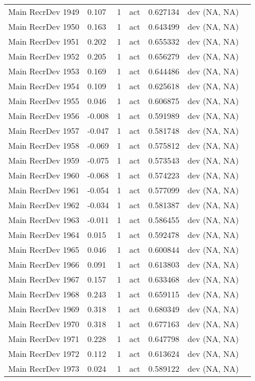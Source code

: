 \documentclass[11pt,
  english,
  a4paper,
]{article}
\begin{document}
\begin{landscape}
\begin{longtable}[t]{>{\raggedright\arraybackslash}p{6cm}lllll>{\raggedright\arraybackslash}p{4cm}}
Main RecrDev 1949 & 0.107 & 1 & act & 0.627134 & dev (NA, NA)\\
Main RecrDev 1950 & 0.163 & 1 & act & 0.643499 & dev (NA, NA)\\
Main RecrDev 1951 & 0.202 & 1 & act & 0.655332 & dev (NA, NA)\\
Main RecrDev 1952 & 0.205 & 1 & act & 0.656279 & dev (NA, NA)\\
Main RecrDev 1953 & 0.169 & 1 & act & 0.644486 & dev (NA, NA)\\
Main RecrDev 1954 & 0.109 & 1 & act & 0.625618 & dev (NA, NA)\\
Main RecrDev 1955 & 0.046 & 1 & act & 0.606875 & dev (NA, NA)\\
Main RecrDev 1956 & -0.008 & 1 & act & 0.591989 & dev (NA, NA)\\
Main RecrDev 1957 & -0.047 & 1 & act & 0.581748 & dev (NA, NA)\\
Main RecrDev 1958 & -0.069 & 1 & act & 0.575812 & dev (NA, NA)\\
Main RecrDev 1959 & -0.075 & 1 & act & 0.573543 & dev (NA, NA)\\
Main RecrDev 1960 & -0.068 & 1 & act & 0.574223 & dev (NA, NA)\\
Main RecrDev 1961 & -0.054 & 1 & act & 0.577099 & dev (NA, NA)\\
Main RecrDev 1962 & -0.034 & 1 & act & 0.581387 & dev (NA, NA)\\
Main RecrDev 1963 & -0.011 & 1 & act & 0.586455 & dev (NA, NA)\\
Main RecrDev 1964 & 0.015 & 1 & act & 0.592478 & dev (NA, NA)\\
Main RecrDev 1965 & 0.046 & 1 & act & 0.600844 & dev (NA, NA)\\
Main RecrDev 1966 & 0.091 & 1 & act & 0.613803 & dev (NA, NA)\\
Main RecrDev 1967 & 0.157 & 1 & act & 0.633468 & dev (NA, NA)\\
Main RecrDev 1968 & 0.243 & 1 & act & 0.659115 & dev (NA, NA)\\
Main RecrDev 1969 & 0.318 & 1 & act & 0.680349 & dev (NA, NA)\\
Main RecrDev 1970 & 0.318 & 1 & act & 0.677163 & dev (NA, NA)\\
Main RecrDev 1971 & 0.228 & 1 & act & 0.647798 & dev (NA, NA)\\
Main RecrDev 1972 & 0.112 & 1 & act & 0.613624 & dev (NA, NA)\\
Main RecrDev 1973 & 0.024 & 1 & act & 0.589122 & dev (NA, NA)\\

\end{longtable}
\end{landscape}
\end{document}
